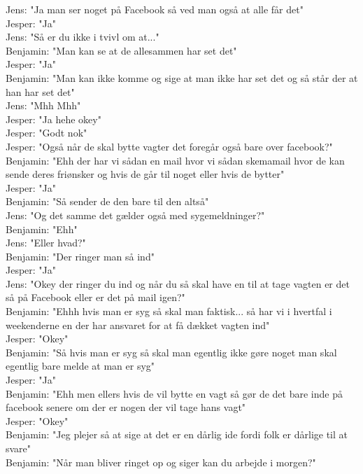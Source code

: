 Jens: "Ja man ser noget på Facebook så ved man også at alle får det"\\
Jesper: "Ja"\\
Jens: "Så er du ikke i tvivl om at..."\\
Benjamin: "Man kan se at de allesammen har set det"\\
Jesper: "Ja"\\
Benjamin: "Man kan ikke komme og sige at man ikke har set det og så står der at han har set det"\\
Jens: "Mhh Mhh"\\
Jesper: "Ja hehe okey"\\
Jesper: "Godt nok"\\
Jesper: "Også når de skal bytte vagter det foregår også bare over facebook?"\\
Benjamin: "Ehh der har vi sådan en mail hvor vi sådan skemamail hvor de kan sende deres friønsker og hvis de går til noget eller hvis de bytter"\\
Jesper: "Ja"\\
Benjamin: "Så sender de den bare til den altså"\\
Jens: "Og det samme det gælder også med sygemeldninger?"\\
Benjamin: "Ehh"\\
Jens: "Eller hvad?"\\
Benjamin: "Der ringer man så ind"\\
Jesper: "Ja"\\
Jens: "Okey der ringer du ind og når du så skal have en til at tage vagten er det så på Facebook eller er det på mail igen?"\\
Benjamin: "Ehhh hvis man er syg så skal man faktisk... så har vi i hvertfal i weekenderne en der har ansvaret for at få dækket vagten ind"\\
Jesper: "Okey"\\
Benjamin: "Så hvis man er syg så skal man egentlig ikke gøre noget man skal egentlig bare melde at man er syg"\\
Jesper: "Ja"\\
Benjamin: "Ehh men ellers hvis de vil bytte en vagt så gør de det bare inde på facebook senere om der er nogen der vil tage hans vagt"\\
Jesper: "Okey"\\
Benjamin: "Jeg plejer så at sige at det er en dårlig ide fordi folk er dårlige til at svare"\\
Benjamin: "Når man bliver ringet op og siger kan du arbejde i morgen?"\\
